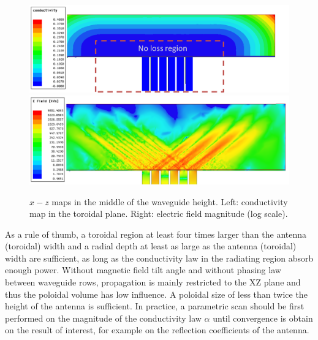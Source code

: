 \begin{figure}[h]
	\centering
	\includegraphics[width=1.0\linewidth]{figures/chap2/LHCD/LH_loss_region}\\
	\includegraphics[width=1.0\linewidth]{figures/chap2/LHCD/LH_electric_field_fine_definition}
	\caption{$x-z$ maps in the middle of the waveguide height. Left: conductivity map in the toroidal plane. Right: electric field magnitude (log scale).}
	\label{fig:LH_HFSS}
\end{figure}

As a rule of thumb, a toroidal region at least four times larger than the antenna (toroidal) width and a radial depth at least as large as the antenna (toroidal) width are sufficient, as long as the conductivity law in the radiating region absorb enough power. Without magnetic field tilt angle and without phasing law between waveguide rows, propagation is mainly restricted to the XZ plane and thus the poloidal volume has low influence. A poloidal size of less than twice the height of the antenna is sufficient. In practice, a parametric scan should be first performed on the magnitude of the conductivity law  $\alpha$ until convergence is obtain on the result of interest, for example on the reflection coefficients of the antenna.

